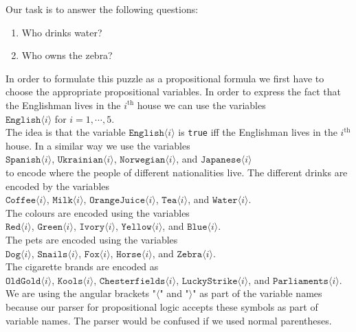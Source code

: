 Our task is to answer the following questions:
\begin{enumerate}
\item Who drinks water?
\item Who owns the zebra?
\end{enumerate}

In order to formulate this puzzle as a propositional formula we first have to
choose the appropriate propositional variables.  In order to express the fact
that the Englishman lives in the $i^\textrm{th}$ house we can use the variables
\\[0.2cm]
\hspace*{1.3cm}
$\texttt{English}\langle i \rangle$ \quad for $i=1,\cdots,5$.
\\[0.2cm]
The idea is that the variable $\texttt{English}\langle i \rangle$ is \texttt{true} iff the
Englishman lives in the  $i^\textrm{th}$ house.  In a similar way we use the
variables
\\[0.2cm]
\hspace*{1.3cm}
$\texttt{Spanish}\langle i \rangle$,\;
$\texttt{Ukrainian}\langle i \rangle$,\;
$\texttt{Norwegian}\langle i \rangle$,\; and 
$\texttt{Japanese}\langle i \rangle$
\\[0.2cm]
to encode where the people of different nationalities live.
The different drinks are encoded by the variables
\\[0.2cm]
\hspace*{1.3cm}
$\texttt{Coffee}\langle i \rangle$,\; $\texttt{Milk}\langle i \rangle$,\; $\texttt{OrangeJuice}\langle i \rangle$,\; $\texttt{Tea}\langle i \rangle$,\; and $\texttt{Water}\langle i \rangle$.
\\[0.2cm] 
The colours are encoded using the variables 
\\[0.2cm]
\hspace*{1.3cm}
$\texttt{Red}\langle i \rangle$,\;
$\texttt{Green}\langle i \rangle$,\;
$\texttt{Ivory}\langle i \rangle$,\;
$\texttt{Yellow}\langle i \rangle$,\; and $\texttt{Blue}\langle i \rangle$.
\\[0.2cm]
The pets are encoded using the variables
\\[0.2cm]
\hspace*{1.3cm}
$\texttt{Dog}\langle i \rangle$,\;
$\texttt{Snails}\langle i \rangle$,\;
$\texttt{Fox}\langle i \rangle$,\;
$\texttt{Horse}\langle i \rangle$,\;
and $\texttt{Zebra}\langle i \rangle$.
\\[0.2cm]
The cigarette brands are encoded as
\\[0.2cm]
\hspace*{1.3cm}
$\texttt{OldGold}\langle i \rangle$,\; $\texttt{Kools}\langle i \rangle$,\;
$\texttt{Chesterfields}\langle i \rangle$,\; $\texttt{LuckyStrike}\langle i \rangle$,\; and
$\texttt{Parliaments}\langle i \rangle$.
\\[0.2cm]
We are using the angular brackets "$\langle$" and "$\rangle$" as part of the
variable names because our parser for propositional logic accepts these symbols
as part of variable names.  The parser would be confused if we used
normal parentheses.  

